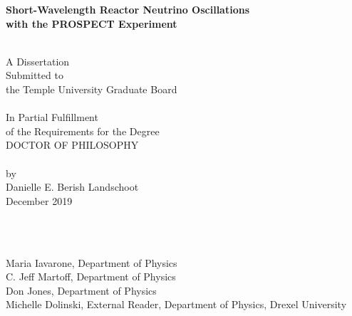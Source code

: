 \begin{titlepage}
	
	\begin{centering} 
		{\bf {\Large Short-Wavelength Reactor Neutrino Oscillations \\ with the PROSPECT Experiment}}
		
		\vspace{1cm}
		\noindent\makebox[\linewidth]{\rule{16cm}{0.4pt}} \\ 
		\vspace{1cm}
		A Dissertation                       \\
		Submitted to                         \\
		the Temple University Graduate Board \\
		\vspace{1cm}
		\noindent\makebox[\linewidth]{\rule{16cm}{0.4pt}} \\ 
		\vspace{1cm} 
		In Partial Fulfillment               \\
		of the Requirements for the Degree   \\
		DOCTOR OF PHILOSOPHY                 \\
		\vspace{1cm} 
		\noindent\makebox[\linewidth]{\rule{16cm}{0.4pt}} \\ 
		\vspace{1cm} 
		by                                   \\
		Danielle E. Berish Landschoot                      \\
		December 2019                            \\
	\end{centering}                      
	
	\vspace{1cm}
	\\
	\vspace{0.20cm}
	
	        \\
	{Maria Iavarone, Department of Physics}                                        \\
	{C. Jeff Martoff, Department of Physics}                                       \\
	{Don Jones, Department of Physics}                                       \\
	{Michelle  Dolinski, External Reader, Department of Physics, Drexel University}
	
\end{titlepage}
